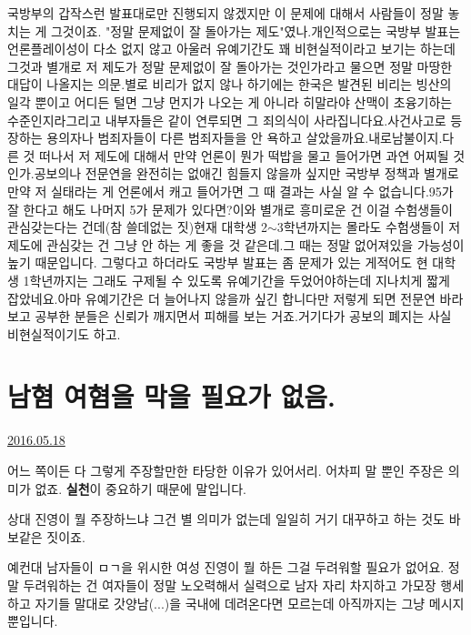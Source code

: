 국방부의 갑작스런 발표대로만 진행되지 않겠지만 이 문제에 대해서 사람들이 정말 놓치는 게 그것이죠. "정말 문제없이 잘 돌아가는 제도"였나.개인적으로는 국방부 발표는 언론플레이성이 다소 없지 않고 아울러 유예기간도 꽤 비현실적이라고 보기는 하는데그것과 별개로 저 제도가 정말 문제없이 잘 돌아가는 것인가라고 물으면 정말 마땅한 대답이 나올지는 의문.별로 비리가 없지 않나 하기에는 한국은 발견된 비리는 빙산의 일각 뿐이고 어디든 털면 그냥 먼지가 나오는 게 아니라 히말라야 산맥이 초융기하는 수준인지라그리고 내부자들은 같이 연루되면 그 죄의식이 사라집니다요.사건사고로 등장하는 용의자나 범죄자들이 다른 범죄자들을 안 욕하고 살았을까요.내로남불이지.다른 것 떠나서 저 제도에 대해서 만약 언론이 뭔가 떡밥을 물고 들어가면 과연 어찌될 것인가.공보의나 전문연을 완전히는 없애긴 힘들지 않을까 싶지만 국방부 정책과 별개로 만약 저 실태라는 게 언론에서 캐고 들어가면 그 때 결과는 사실 알 수 없습니다.95가 잘 한다고 해도 나머지 5가 문제가 있다면?이와 별개로 흥미로운 건 이걸 수험생들이 관심갖는다는 건데(참 쓸데없는 짓)현재 대학생 2$\sim$3학년까지는 몰라도 수험생들이 저 제도에 관심갖는 건 그냥 안 하는 게 좋을 것 같은데.그 때는 정말 없어져있을 가능성이 높기 때문입니다. 그렇다고 하더라도 국방부 발표는 좀 문제가 있는 게적어도 현 대학생 1학년까지는 그래도 구제될 수 있도록 유예기간을 두었어야하는데 지나치게 짧게 잡았네요.아마 유예기간은 더 늘어나지 않을까 싶긴 합니다만 저렇게 되면 전문연 바라보고 공부한 분들은 신뢰가 깨지면서 피해를 보는 거죠.거기다가 공보의 폐지는 사실 비현실적이기도 하고.




\section{남혐 여혐을 막을 필요가 없음.}
\href{https://www.kockoc.com/Apoc/781211}{2016.05.18}

\vspace{5mm}

어느 쪽이든 다 그렇게 주장할만한 타당한 이유가 있어서리.
어차피 말 뿐인 주장은 의미가 없죠. \textbf{실천}이 중요하기 때문에 말입니다.
\vspace{5mm}

상대 진영이 뭘 주장하느냐 그건 별 의미가 없는데 일일히 거기 대꾸하고 하는 것도 바보같은 짓이죠.
\vspace{5mm}

예컨대 남자들이 ㅁㄱ을 위시한 여성 진영이 뭘 하든 그걸 두려워할 필요가 없어요.
정말 두려워하는 건 여자들이 정말 노오력해서 실력으로 남자 자리 차지하고 가모장 행세하고
자기들 말대로 갓양남(...)을 국내에 데려온다면 모르는데 아직까지는 그냥 메시지 뿐입니다.
\vspace{5mm}

